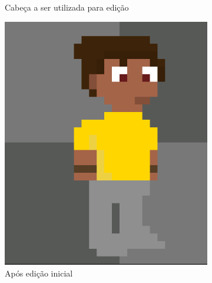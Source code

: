 \begin{figure}[htbp]
\begin{subfigure}{0.23\linewidth}
        \caption{\small Cabeça a ser utilizada para edição}
        \label{fig:pixelLabAjusteFino2b}
    \end{subfigure}
    \begin{subfigure}{0.23\linewidth}
        \centering
        \includegraphics[width=0.83\linewidth]{figs/pixelLab/dia2/fix_teste_3.PNG}
        \caption{\small Após edição inicial}
        \label{fig:pixelLabAjusteFino2c}
    \end{subfigure}
    \begin{subfigure}{0.23\linewidth}
        \centering

\end{subfigure}
\end{figure}

